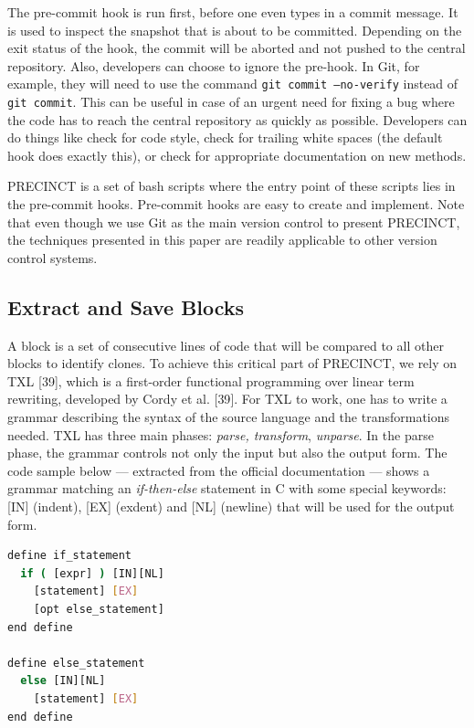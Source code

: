 \documentclass[12pt]{report}
\begin{document}
The pre-commit hook is run first, before one even types in a commit
message. It is used to inspect the snapshot that is about to be
committed. Depending on the exit status of the hook, the commit will be
aborted and not pushed to the central repository. Also, developers can
choose to ignore the pre-hook. In Git, for example, they will need to
use the command \lstinline!git commit –no-verify! instead of
\lstinline!git commit!. This can be useful in case of an urgent need for
fixing a bug where the code has to reach the central repository as
quickly as possible. Developers can do things like check for code style,
check for trailing white spaces (the default hook does exactly this), or
check for appropriate documentation on new methods.

PRECINCT is a set of bash scripts where the entry point of these scripts
lies in the pre-commit hooks. Pre-commit hooks are easy to create and
implement. Note that even though we use Git as the main version control
to present PRECINCT, the techniques presented in this paper are readily
applicable to other version control systems.

\subsection{Extract and Save Blocks}\label{extract-and-save-blocks}

A block is a set of consecutive lines of code that will be compared to
all other blocks to identify clones. To achieve this critical part of
PRECINCT, we rely on TXL {[}39{]}, which is a first-order functional
programming over linear term rewriting, developed by Cordy et al.
{[}39{]}. For TXL to work, one has to write a grammar describing the
syntax of the source language and the transformations needed. TXL has
three main phases: \emph{parse, transform}, \emph{unparse}. In the parse
phase, the grammar controls not only the input but also the output form.
The code sample below --- extracted from the official documentation ---
shows a grammar matching an \emph{if-then-else} statement in C with some
special keywords: {[}IN{]} (indent), {[}EX{]} (exdent) and {[}NL{]}
(newline) that will be used for the output form.

\begin{lstlisting}[language=bash]
define if_statement
  if ( [expr] ) [IN][NL]
    [statement] [EX]
    [opt else_statement]
end define

define else_statement
  else [IN][NL]
    [statement] [EX]
end define
\end{lstlisting}
\end{document}
